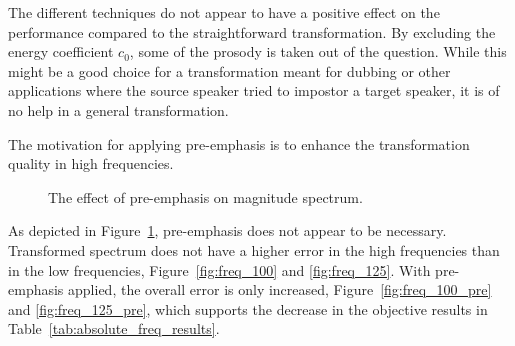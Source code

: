 The different techniques do not appear to have a positive effect on the performance compared to the straightforward transformation. By excluding the energy coefficient $c_0$, some of the prosody is taken out of the question. While this might be a good choice for a transformation meant for dubbing or other applications where the source speaker tried to impostor a target speaker, it is of no help in a general transformation.

The motivation for applying pre-emphasis is to enhance the transformation quality in high frequencies.
\begin{figure}[htbp]
	\begin{center}
	\caption{The effect of pre-emphasis on magnitude spectrum.}
	\label{fig:pre_emphasis_magnitude_spectrum}
	\end{center}
\end{figure}
As depicted in Figure~\ref{fig:pre_emphasis_magnitude_spectrum}, pre-emphasis does not appear to be necessary. Transformed spectrum does not have a higher error in the high frequencies than in the low frequencies, Figure~\ref{fig:freq_100} and \ref{fig:freq_125}. With pre-emphasis applied, the overall error is only increased, Figure~\ref{fig:freq_100_pre} and \ref{fig:freq_125_pre}, which supports the decrease in the objective results in Table~\ref{tab:absolute_freq_results}.

